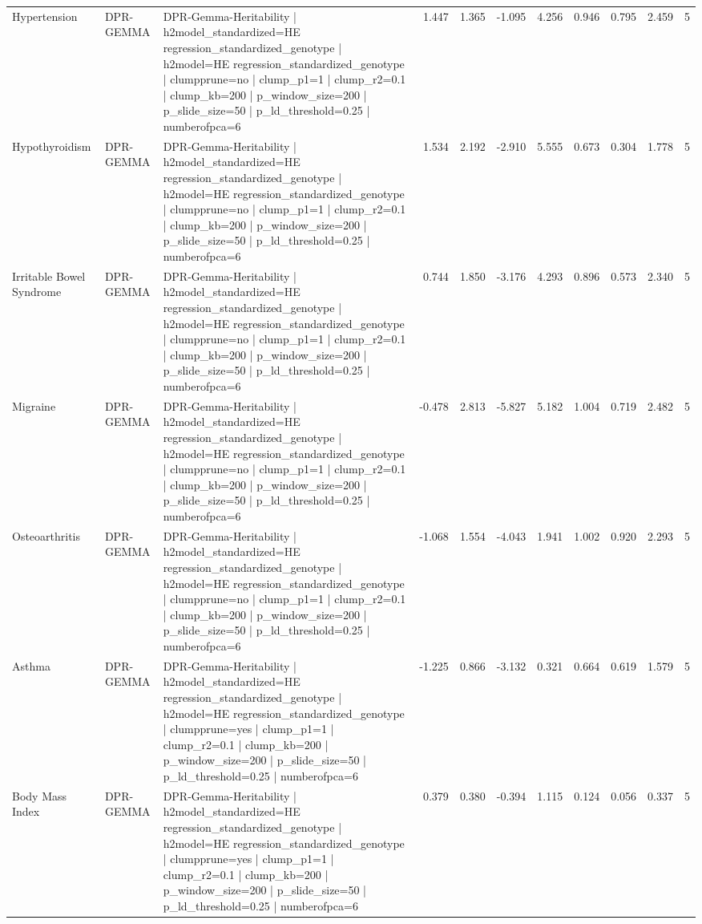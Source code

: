 \begin{landscape}
\begin{longtable}{p{2.4cm}p{1.8cm}p{6.0cm}rrrrrrrr}
Hypertension & DPR-GEMMA & DPR-Gemma-Heritability | h2model\_standardized=HE regression\_standardized\_genotype | h2model=HE regression\_standardized\_genotype | clumpprune=no | clump\_p1=1 | clump\_r2=0.1 | clump\_kb=200 | p\_window\_size=200 | p\_slide\_size=50 | p\_ld\_threshold=0.25 | numberofpca=6 & 1.447 & 1.365 & -1.095 & 4.256 & 0.946 & 0.795 & 2.459 & 5 \\
Hypothyroidism & DPR-GEMMA & DPR-Gemma-Heritability | h2model\_standardized=HE regression\_standardized\_genotype | h2model=HE regression\_standardized\_genotype | clumpprune=no | clump\_p1=1 | clump\_r2=0.1 | clump\_kb=200 | p\_window\_size=200 | p\_slide\_size=50 | p\_ld\_threshold=0.25 | numberofpca=6 & 1.534 & 2.192 & -2.910 & 5.555 & 0.673 & 0.304 & 1.778 & 5 \\
Irritable Bowel Syndrome & DPR-GEMMA & DPR-Gemma-Heritability | h2model\_standardized=HE regression\_standardized\_genotype | h2model=HE regression\_standardized\_genotype | clumpprune=no | clump\_p1=1 | clump\_r2=0.1 | clump\_kb=200 | p\_window\_size=200 | p\_slide\_size=50 | p\_ld\_threshold=0.25 | numberofpca=6 & 0.744 & 1.850 & -3.176 & 4.293 & 0.896 & 0.573 & 2.340 & 5 \\
Migraine & DPR-GEMMA & DPR-Gemma-Heritability | h2model\_standardized=HE regression\_standardized\_genotype | h2model=HE regression\_standardized\_genotype | clumpprune=no | clump\_p1=1 | clump\_r2=0.1 | clump\_kb=200 | p\_window\_size=200 | p\_slide\_size=50 | p\_ld\_threshold=0.25 | numberofpca=6 & -0.478 & 2.813 & -5.827 & 5.182 & 1.004 & 0.719 & 2.482 & 5 \\
Osteoarthritis & DPR-GEMMA & DPR-Gemma-Heritability | h2model\_standardized=HE regression\_standardized\_genotype | h2model=HE regression\_standardized\_genotype | clumpprune=no | clump\_p1=1 | clump\_r2=0.1 | clump\_kb=200 | p\_window\_size=200 | p\_slide\_size=50 | p\_ld\_threshold=0.25 | numberofpca=6 & -1.068 & 1.554 & -4.043 & 1.941 & 1.002 & 0.920 & 2.293 & 5 \\
Asthma & DPR-GEMMA & DPR-Gemma-Heritability | h2model\_standardized=HE regression\_standardized\_genotype | h2model=HE regression\_standardized\_genotype | clumpprune=yes | clump\_p1=1 | clump\_r2=0.1 | clump\_kb=200 | p\_window\_size=200 | p\_slide\_size=50 | p\_ld\_threshold=0.25 | numberofpca=6 & -1.225 & 0.866 & -3.132 & 0.321 & 0.664 & 0.619 & 1.579 & 5 \\
Body Mass Index & DPR-GEMMA & DPR-Gemma-Heritability | h2model\_standardized=HE regression\_standardized\_genotype | h2model=HE regression\_standardized\_genotype | clumpprune=yes | clump\_p1=1 | clump\_r2=0.1 | clump\_kb=200 | p\_window\_size=200 | p\_slide\_size=50 | p\_ld\_threshold=0.25 | numberofpca=6 & 0.379 & 0.380 & -0.394 & 1.115 & 0.124 & 0.056 & 0.337 & 5 \\

\end{longtable}
\end{landscape}
